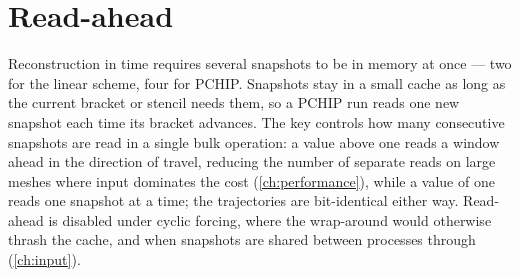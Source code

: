 \section{Read-ahead}\label{sec:temp-prefetch}

Reconstruction in time requires several snapshots to be in memory at once --- two for the linear scheme,
four for PCHIP. Snapshots stay in a small cache as long as the current bracket or stencil needs them, so
a PCHIP run reads one new snapshot each time its bracket advances. The key  controls
how many consecutive snapshots are read in a single bulk operation: a value above one reads a window ahead
in the direction of travel, reducing the number of separate reads on large meshes where input dominates
the cost (\cref{ch:performance}), while a value of one reads one snapshot at a time; the trajectories are
bit-identical either way. Read-ahead is disabled under cyclic forcing, where the wrap-around would
otherwise thrash the cache, and when snapshots are shared between processes through
 (\cref{ch:input}).

